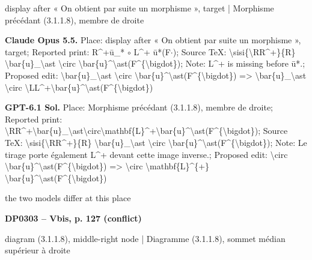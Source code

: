 display after « On obtient par suite un morphisme », target | Morphisme précédant (3.1.1.8), membre de droite\par
\textbf{Claude Opus 5.5.} Place: display after « On obtient par suite un morphisme », target; Reported print: R\textasciicircum{}+ū\_* \ensuremath{\circ} L\textasciicircum{}+ ū*(F\ensuremath{\cdot}); Source TeX: \textbackslash{}sisi\{\textbackslash{}RR\textasciicircum{}+\}\{R\} \textbackslash{}bar\{u\}\_\textbackslash{}ast \textbackslash{}circ \textbackslash{}bar\{u\}\textasciicircum{}\textbackslash{}ast(F\textasciicircum{}\{\textbackslash{}bigdot\}); Note: L\textasciicircum{}+ is missing before ū*.; Proposed edit: \textbackslash{}bar\{u\}\_\textbackslash{}ast \textbackslash{}circ \textbackslash{}bar\{u\}\textasciicircum{}\textbackslash{}ast(F\textasciicircum{}\{\textbackslash{}bigdot\}) =\allowbreak > \textbackslash{}bar\{u\}\_\textbackslash{}ast \textbackslash{}circ \textbackslash{}LL\textasciicircum{}+\textbackslash{}bar\{u\}\textasciicircum{}\textbackslash{}ast(F\textasciicircum{}\{\textbackslash{}bigdot\})\par
\textbf{GPT-6.1 Sol.} Place: Morphisme précédant (3.1.1.8), membre de droite; Reported print: \textbackslash{}RR\textasciicircum{}+\textbackslash{}bar\{u\}\_\textbackslash{}ast\textbackslash{}circ\textbackslash{}mathbf\{L\}\textasciicircum{}+\textbackslash{}bar\{u\}\textasciicircum{}\textbackslash{}ast(F\textasciicircum{}\{\textbackslash{}bigdot\}); Source TeX: \textbackslash{}sisi\{\textbackslash{}RR\textasciicircum{}+\}\{R\} \textbackslash{}bar\{u\}\_\textbackslash{}ast \textbackslash{}circ \textbackslash{}bar\{u\}\textasciicircum{}\textbackslash{}ast(F\textasciicircum{}\{\textbackslash{}bigdot\}); Note: Le tirage porte également L\textasciicircum{}+ devant cette image inverse.; Proposed edit: \textbackslash{}circ \textbackslash{}bar\{u\}\textasciicircum{}\textbackslash{}ast(F\textasciicircum{}\{\textbackslash{}bigdot\}) =\allowbreak > \textbackslash{}circ \textbackslash{}mathbf\{L\}\textasciicircum{}\{+\} \textbackslash{}bar\{u\}\textasciicircum{}\textbackslash{}ast(F\textasciicircum{}\{\textbackslash{}bigdot\})\par
the two models differ at this place\par
\par\noindent\hypertarget{DP0303}{}\textbf{DP0303 -- Vbis, p. 127 (conflict)}\par
diagram (3.1.1.8), middle-right node | Diagramme (3.1.1.8), sommet médian supérieur à droite\par
